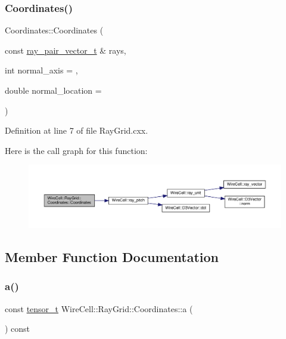 \subsubsection{\texorpdfstring{Coordinates()}{Coordinates()}}
{\footnotesize\ttfamily Coordinates\+::\+Coordinates (\begin{DoxyParamCaption}\item[{const \hyperlink{namespace_wire_cell_a15d47ec1e9e43890c5cb09f1e9d77dd3}{ray\+\_\+pair\+\_\+vector\+\_\+t} \&}]{rays,  }\item[{int}]{normal\+\_\+axis = {},  }\item[{double}]{normal\+\_\+location = {} }\end{DoxyParamCaption})}



Definition at line 7 of file Ray\+Grid.\+cxx.

Here is the call graph for this function\+:
\nopagebreak
\begin{figure}[H]
\begin{center}
\leavevmode
\includegraphics[width=350pt]{class_wire_cell_1_1_ray_grid_1_1_coordinates_a4b9a727396d48768585d9d13916b88c1_cgraph}
\end{center}
\end{figure}


\subsection{Member Function Documentation}
\mbox{\label{class_wire_cell_1_1_ray_grid_1_1_coordinates_af5865a6804daf4b4a38c8d3a132a7e48}} 
\subsubsection{\texorpdfstring{a()}{a()}}
{\footnotesize\ttfamily const \hyperlink{namespace_wire_cell_1_1_ray_grid_adaca791d3ebd5f5c455aa89966289111}{tensor\+\_\+t} Wire\+Cell\+::\+Ray\+Grid\+::\+Coordinates\+::a (\begin{DoxyParamCaption}{ }\end{DoxyParamCaption}) const\hspace{0.3cm}{\ttfamily [inline]}}



